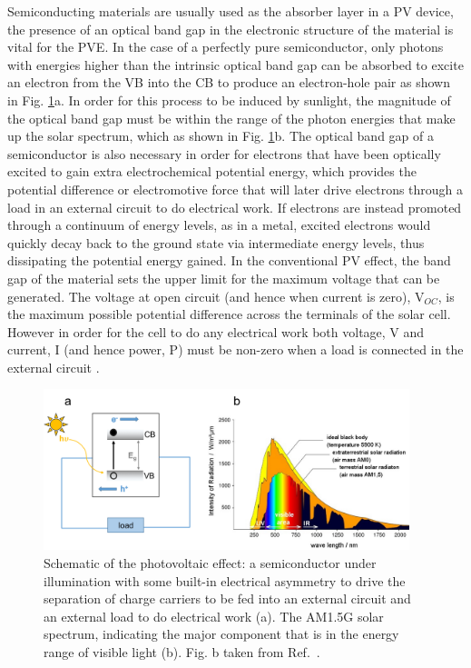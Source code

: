 \documentclass[11pt, twoside]{report}
\begin{document}
Semiconducting materials are usually used as the absorber layer in a PV device, the presence of an optical band gap in the electronic structure of the material is vital for the PVE. In the case of a perfectly pure semiconductor, only photons with energies higher than the intrinsic optical band gap can be absorbed to excite an electron from the VB into the CB to produce an electron-hole pair as shown in Fig. \ref{PV_schematic}a. In order for this process to be induced by sunlight, the magnitude of the optical band gap must be within the range of the photon energies that make up the solar spectrum, which as shown in Fig. \ref{PV_schematic}b. The optical band gap of a semiconductor is also necessary in order for electrons that have been optically excited to gain extra electrochemical potential energy, which provides the potential difference or electromotive force that will later drive electrons through a load in an external circuit to do electrical work. If electrons are instead promoted through a continuum of energy levels, as in a metal, excited electrons would quickly decay back to the ground state via intermediate energy levels, thus dissipating the potential energy gained. In the conventional PV effect, the band gap of the material sets the upper limit for the maximum voltage that can be generated. The voltage at open circuit (and hence when current is zero), V$_{OC}$, is the maximum possible potential difference across the terminals of the solar cell. However in order for the cell to do any electrical work both voltage, V and current, I (and hence power, P) must be non-zero when a load is connected in the external circuit \cite{Nelson3}.

\begin{figure}[h!]
  \centering
    \includegraphics[width=0.95\textwidth]{figures/PV_schematic.png}
    \caption[Schematic of the photovoltaic effect: a semiconductor under illumination with some built-in electrical asymmetry to drive the separation of charge carriers to be fed into an external circuit and an external load to do electrical work (a). The AM1.5G solar spectrum, indicating the major component that is in the energy range of visible light (b).]{Schematic of the photovoltaic effect: a semiconductor under illumination with some built-in electrical asymmetry to drive the separation of charge carriers to be fed into an external circuit and an external load to do electrical work (a). The AM1.5G solar spectrum, indicating the major component that is in the energy range of visible light (b). Fig. b taken from Ref.~.}
  \label{PV_schematic}
\end{figure}
\end{document}
